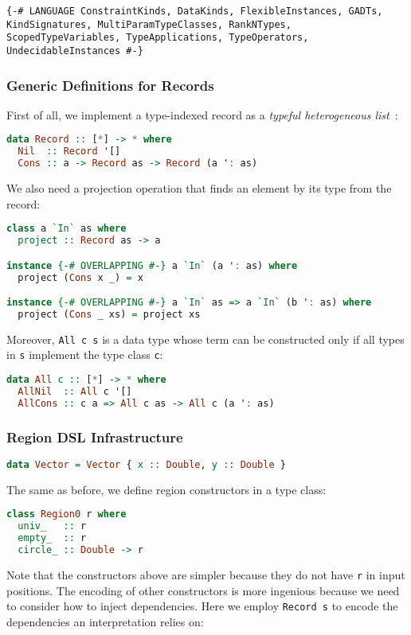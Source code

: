 \begin{lstlisting}
{-# LANGUAGE ConstraintKinds, DataKinds, FlexibleInstances, GADTs, KindSignatures, MultiParamTypeClasses, RankNTypes, ScopedTypeVariables, TypeApplications, TypeOperators, UndecidableInstances #-}
\end{lstlisting}

\subsubsection{Generic Definitions for Records}

First of all, we implement a type-indexed record as a \emph{typeful
heterogeneous list}~\citep{kiselyov2004strongly}:

\begin{lstlisting}[language=Haskell]
data Record :: [*] -> * where
  Nil  :: Record '[]
  Cons :: a -> Record as -> Record (a ': as)
\end{lstlisting}
\noindent
We also need a projection operation that finds an element by its type
from the record:

\begin{lstlisting}[language=Haskell]
class a `In` as where
  project :: Record as -> a

instance {-# OVERLAPPING #-} a `In` (a ': as) where
  project (Cons x _) = x

instance {-# OVERLAPPING #-} a `In` as => a `In` (b ': as) where
  project (Cons _ xs) = project xs
\end{lstlisting}
\noindent
Moreover, \lstinline!All c s! is a data type whose term
can be constructed only if all types in \lstinline!s!
implement the type class \lstinline!c!:

\begin{lstlisting}[language=Haskell]
data All c :: [*] -> * where
  AllNil  :: All c '[]
  AllCons :: c a => All c as -> All c (a ': as)
\end{lstlisting}

\subsubsection{Region DSL Infrastructure}

\begin{lstlisting}[language=Haskell]
data Vector = Vector { x :: Double, y :: Double }
\end{lstlisting}
\noindent
The same as before, we define region constructors in a type class:

\begin{lstlisting}[language=Haskell]
class Region0 r where
  univ_   :: r
  empty_  :: r
  circle_ :: Double -> r
\end{lstlisting}
\noindent
Note that the constructors above are simpler because they do not have
\lstinline!r! in input positions. The encoding of other
constructors is more ingenious because we need to consider how to inject
dependencies. Here we employ \lstinline!Record s! to
encode the dependencies an interpretation relies on:

